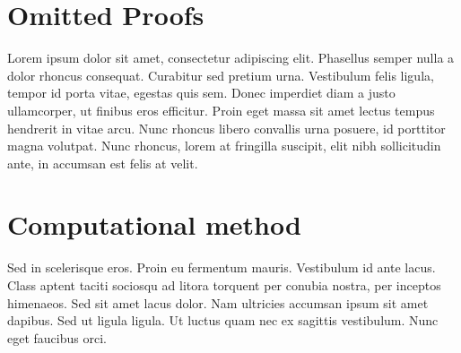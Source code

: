 \begin{appendices}
    \makeatletter

    \chapter{Omitted Proofs}

    Lorem ipsum dolor sit amet, consectetur adipiscing elit. Phasellus semper nulla a dolor rhoncus consequat. Curabitur sed pretium urna. Vestibulum felis ligula, tempor id porta vitae, egestas quis sem. Donec imperdiet diam a justo ullamcorper, ut finibus eros efficitur. Proin eget massa sit amet lectus tempus hendrerit in vitae arcu. Nunc rhoncus libero convallis urna posuere, id porttitor magna volutpat. Nunc rhoncus, lorem at fringilla suscipit, elit nibh sollicitudin ante, in accumsan est felis at velit.

    \chapter{Computational method}

    Sed in scelerisque eros. Proin eu fermentum mauris. Vestibulum id ante lacus. Class aptent taciti sociosqu ad litora torquent per conubia nostra, per inceptos himenaeos. Sed sit amet lacus dolor. Nam ultricies accumsan ipsum sit amet dapibus. Sed ut ligula ligula. Ut luctus quam nec ex sagittis vestibulum. Nunc eget faucibus orci.
\end{appendices}
